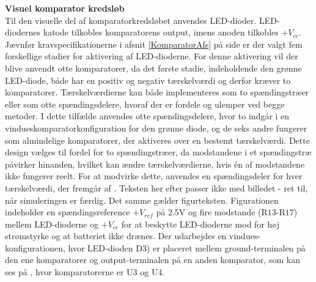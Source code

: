 \noindent\textbf{Visuel komparator kredsløb} \\
Til den visuelle del af komparatorkredsløbet anvendes LED-dioder. LED-diodernes katode tilkobles komparatorens output, imens anoden tilkobles $+V_{cc}$. Jævnfør kravspecifikationerne i afsnit \ref{KomparatorAfs} på side \pageref{KomparatorAfs} er der valgt fem forskellige stadier for aktivering af LED-dioderne. For denne aktivering vil der blive anvendt otte komparatorer, da det første stadie, indeholdende den grønne LED-diode, både har en positiv og negativ tærskelværdi og derfor kræver to komparatorer. Tærskelværdierne kan både implementeres som to spændingstræer eller som otte spændingsdelere, hvoraf der er fordele og ulemper ved begge metoder. I dette tilfælde anvendes otte spændingsdelere, hvor to indgår i en vindueskomparatorkonfiguration for den grønne diode, og de seks andre fungerer som almindelige komparatorer, der aktiveres over en bestemt tærskelværdi. Dette design vælges til fordel for to spændingstræer, da modstandene i et spændingstræ påvirker hinanden, hvilket kan ændre tærskelværdierne, hvis én af modstandene ikke fungerer reelt. For at modvirke dette, anvendes en spændingsdeler for hver tærskelværdi, der fremgår af . {\color{red}Teksten her efter passer ikke med billedet - ret til, når simuleringen er færdig. Det samme gælder figurteksten.} Figurationen indeholder en spændingsreference $+V_{ref}$ på $2.5$V og fire modstande (R$13$-R$17$) mellem LED-dioderne og $+V_{cc}$ for at beskytte LED-dioderne mod for høj strømstyrke og at batteriet ikke drænes. Der udarbejdes en vindues-konfigurationen, hvor LED-dioden D$3$) er placeret mellem ground-terminalen på den ene komparatorer og output-terminalen på en anden komparator, som kan ses på , hvor komparatorerne er U$3$ og U$4$. 
